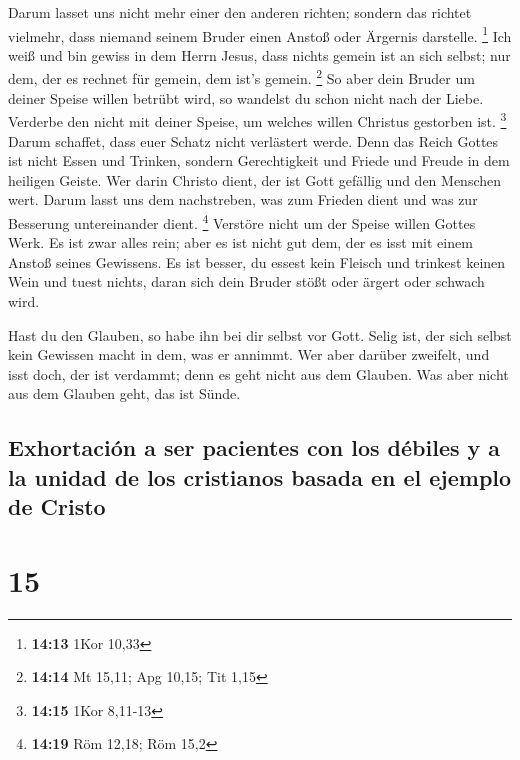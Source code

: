  Darum lasset uns nicht mehr einer den anderen richten;
sondern das richtet vielmehr, dass niemand seinem Bruder einen Anstoß
oder Ärgernis darstelle. \footnote{\textbf{14:13} 1Kor 10,33}
 Ich weiß und bin gewiss in dem Herrn Jesus, dass nichts
gemein ist an sich selbst; nur dem, der es rechnet für gemein, dem ist's
gemein. \footnote{\textbf{14:14} Mt 15,11; Apg 10,15; Tit 1,15}
 So aber dein Bruder um deiner Speise willen betrübt
wird, so wandelst du schon nicht nach der Liebe. Verderbe den nicht mit
deiner Speise, um welches willen Christus gestorben ist. \footnote{\textbf{14:15}
  1Kor 8,11-13}  Darum schaffet, dass euer Schatz nicht
verlästert werde.  Denn das Reich Gottes ist nicht Essen
und Trinken, sondern Gerechtigkeit und Friede und Freude in dem heiligen
Geiste.  Wer darin Christo dient, der ist Gott gefällig
und den Menschen wert.  Darum lasst uns dem nachstreben,
was zum Frieden dient und was zur Besserung untereinander dient.
\footnote{\textbf{14:19} Röm 12,18; Röm 15,2}  Verstöre
nicht um der Speise willen Gottes Werk. Es ist zwar alles rein; aber es
ist nicht gut dem, der es isst mit einem Anstoß seines Gewissens.
 Es ist besser, du essest kein Fleisch und trinkest
keinen Wein und tuest nichts, daran sich dein Bruder stößt oder ärgert
oder schwach wird.

 Hast du den Glauben, so habe ihn bei dir selbst vor
Gott. Selig ist, der sich selbst kein Gewissen macht in dem, was er
annimmt.  Wer aber darüber zweifelt, und isst doch, der
ist verdammt; denn es geht nicht aus dem Glauben. Was aber nicht aus dem
Glauben geht, das ist Sünde.

\hypertarget{exhortaciuxf3n-a-ser-pacientes-con-los-duxe9biles-y-a-la-unidad-de-los-cristianos-basada-en-el-ejemplo-de-cristo}{%
\subsection{Exhortación a ser pacientes con los débiles y a la unidad de
los cristianos basada en el ejemplo de
Cristo}\label{exhortaciuxf3n-a-ser-pacientes-con-los-duxe9biles-y-a-la-unidad-de-los-cristianos-basada-en-el-ejemplo-de-cristo}}

\hypertarget{section-14}{%
\section{15}\label{section-14}}

